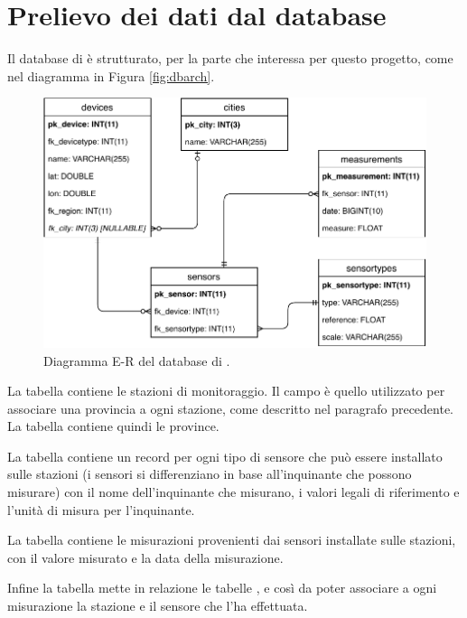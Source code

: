 \section{Prelievo dei dati dal database}\label{sec:database}

Il database di \MonIQA{} è strutturato, per la parte che interessa per questo
progetto, come nel diagramma in Figura \vref{fig:dbarch}.

\begin{figure}[htb]
	\centering
	\includegraphics[width=\textwidth]{img/dbarch}
	\caption{Diagramma E-R del database di \MonIQA\@.}\label{fig:dbarch}
\end{figure}

La tabella  contiene le stazioni di monitoraggio. Il campo
 è quello utilizzato per associare una provincia a ogni stazione,
come descritto nel paragrafo precedente. La tabella  contiene
quindi le province.

La tabella  contiene un record per ogni tipo di sensore che
può essere installato sulle stazioni (i sensori si differenziano in base
all'inquinante che possono misurare) con il nome dell'inquinante che misurano, i
valori legali di riferimento e l'unità di misura per l'inquinante.

La tabella  contiene le misurazioni provenienti dai sensori
installate sulle stazioni, con il valore misurato e la data della misurazione.

Infine la tabella  mette in relazione le tabelle ,
 e  così da poter associare a ogni
misurazione la stazione e il sensore che l'ha effettuata.


